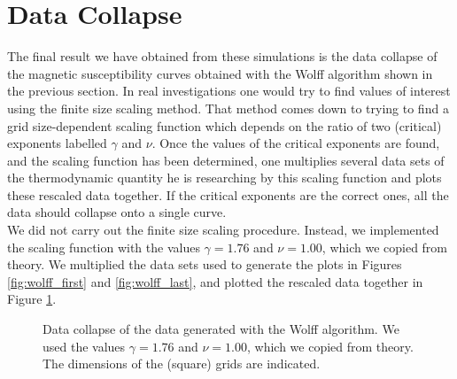 \documentclass[11pt,a4paper]{article}
\begin{document}
\pagebreak




\section{Data Collapse}

The final result we have obtained from these simulations is the data collapse of the magnetic susceptibility curves obtained with
 the Wolff algorithm shown in the previous section. In real investigations one would try to find values of interest using the 
 finite size scaling method. That method comes down to trying to find a grid size-dependent scaling function which depends on the
 ratio of two (critical) exponents labelled $\gamma$ and $\nu$. Once the values of the critical exponents are found, and the scaling
 function has been determined, one multiplies several data sets of the thermodynamic quantity he is researching by this 
 scaling function and plots these rescaled data together. If the critical exponents are the correct ones, all the data should
 collapse onto a single curve. \\

We did not carry out the finite size scaling procedure. Instead, we implemented the scaling function with the values $\gamma = 1.76$
 and $\nu = 1.00$, which we copied from theory. We multiplied the data sets used to generate the plots in Figures
 \ref{fig:wolff_first} and \ref{fig:wolff_last}, and plotted the rescaled data together in Figure \ref{fig:data_collapse}.

\begin{figure}[H]

  \caption{Data collapse of the data generated with the Wolff algorithm. We used the values $\gamma = 1.76$ and $\nu = 1.00$, 
    which we copied from theory. The dimensions of the (square) grids are indicated. }

\label{fig:data_collapse}
\end{figure}
\end{document}

